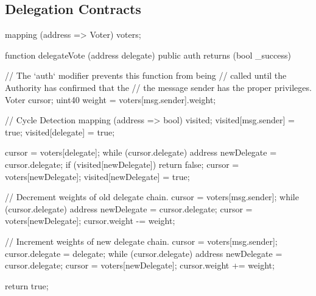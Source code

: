 \subsection{Delegation Contracts}

\begin{solidity}
mapping (address => Voter) voters;

function delegateVote (address delegate) public auth returns (bool _success) {
  // The `auth` modifier prevents this function from being
  // called until the Authority has confirmed that the
  // the message sender has the proper privileges.
  Voter cursor;
  uint40 weight = voters[msg.sender].weight;

  // Cycle Detection
  mapping (address => bool) visited;
  visited[msg.sender] = true;
  visited[delegate] = true;

  cursor = voters[delegate];
  while (cursor.delegate) {
    address newDelegate = cursor.delegate;
    if (visited[newDelegate]) return false;
    cursor = voters[newDelegate];
    visited[newDelegate] = true;
  }

  // Decrement weights of old delegate chain.
  cursor = voters[msg.sender];
  while (cursor.delegate) {
    address newDelegate = cursor.delegate;
    cursor = voters[newDelegate];
    cursor.weight -= weight;
  }

  // Increment weights of new delegate chain.
  cursor = voters[msg.sender];
  cursor.delegate = delegate;
  while (cursor.delegate) {
    address newDelegate = cursor.delegate;
    cursor = voters[newDelegate];
    cursor.weight += weight;
  }

  return true;
}
\end{solidity}

